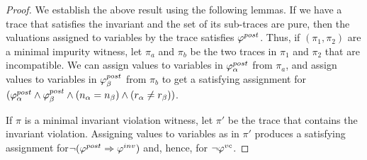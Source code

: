 \begin{proof}
We establish the above result using the following lemmas.
If we have a trace that satisfies the invariant and the set of its sub-traces are pure,
then the valuations assigned to variables by the trace satisfies $\varphi^{post}$.
Thus, if $(\pi_1,\pi_2)$ are a minimal impurity witness, let $\pi_a$ and $\pi_b$
be the two traces in $\pi_1$ and $\pi_2$ that are incompatible.
We can assign values to variables in $\varphi^{post}_\alpha$ from $\pi_a$, and
assign values to variables in $\varphi^{post}_\beta$ from $\pi_b$ to get a satisfying
assignment for $(\varphi^{post}_\alpha \wedge \varphi^{post}_\beta \wedge (n_\alpha = n_\beta) \wedge (r_\alpha \neq r_\beta))$.

If $\pi$ is a minimal invariant violation witness, let $\pi'$ be the trace that contains the invariant violation.
Assigning values to variables as in $\pi'$ produces a satisfying assignment for$\neg (\varphi^{post} \Rightarrow \varphi^{inv})$
and, hence, for $\neg \varphi^{vc}$.

%
%



\end{proof}
